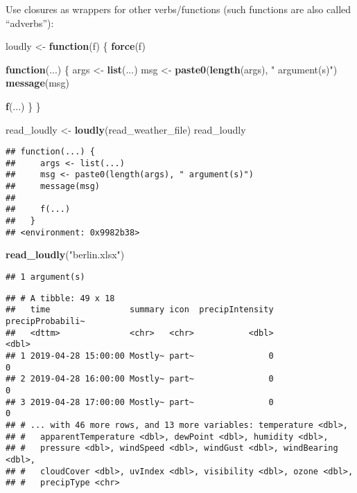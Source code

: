 \documentclass[]{book}
\newenvironment{Shaded}{\begin{snugshade}}{\end{snugshade}}
\newcommand{\ControlFlowTok}[1]{\textcolor[rgb]{0.13,0.29,0.53}{\textbf{#1}}}
\newcommand{\KeywordTok}[1]{\textcolor[rgb]{0.13,0.29,0.53}{\textbf{#1}}}
\newcommand{\NormalTok}[1]{#1}
\newcommand{\StringTok}[1]{\textcolor[rgb]{0.31,0.60,0.02}{#1}}
\begin{document}
Use closures as wrappers for other verbs/functions (such functions are also called ``adverbs''):

\begin{Shaded}
\begin{Highlighting}[]
\NormalTok{loudly <-}\StringTok{ }\ControlFlowTok{function}\NormalTok{(f) \{}
  \KeywordTok{force}\NormalTok{(f)}

  \ControlFlowTok{function}\NormalTok{(...) \{}
\NormalTok{    args <-}\StringTok{ }\KeywordTok{list}\NormalTok{(...)}
\NormalTok{    msg <-}\StringTok{ }\KeywordTok{paste0}\NormalTok{(}\KeywordTok{length}\NormalTok{(args), }\StringTok{" argument(s)"}\NormalTok{)}
    \KeywordTok{message}\NormalTok{(msg)}

    \KeywordTok{f}\NormalTok{(...)}
\NormalTok{  \}}
\NormalTok{\}}

\NormalTok{read_loudly <-}\StringTok{ }\KeywordTok{loudly}\NormalTok{(read_weather_file)}
\NormalTok{read_loudly}
\end{Highlighting}
\end{Shaded}

\begin{verbatim}
## function(...) {
##     args <- list(...)
##     msg <- paste0(length(args), " argument(s)")
##     message(msg)
## 
##     f(...)
##   }
## <environment: 0x9982b38>
\end{verbatim}

\begin{Shaded}
\begin{Highlighting}[]
\KeywordTok{read_loudly}\NormalTok{(}\StringTok{"berlin.xlsx"}\NormalTok{)}
\end{Highlighting}
\end{Shaded}

\begin{verbatim}
## 1 argument(s)
\end{verbatim}

\begin{verbatim}
## # A tibble: 49 x 18
##   time                summary icon  precipIntensity precipProbabili~
##   <dttm>              <chr>   <chr>           <dbl>            <dbl>
## 1 2019-04-28 15:00:00 Mostly~ part~               0                0
## 2 2019-04-28 16:00:00 Mostly~ part~               0                0
## 3 2019-04-28 17:00:00 Mostly~ part~               0                0
## # ... with 46 more rows, and 13 more variables: temperature <dbl>,
## #   apparentTemperature <dbl>, dewPoint <dbl>, humidity <dbl>,
## #   pressure <dbl>, windSpeed <dbl>, windGust <dbl>, windBearing <dbl>,
## #   cloudCover <dbl>, uvIndex <dbl>, visibility <dbl>, ozone <dbl>,
## #   precipType <chr>
\end{verbatim}
\end{document}
